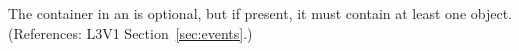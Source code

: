 The  container in an \Event is optional, but
if present, it must contain at least one \EventAssignment object.
(References: L3V1 Section~\ref{sec:events}.)
